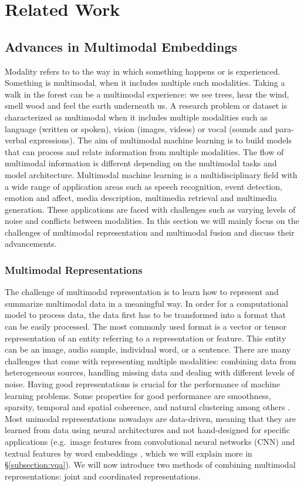 \documentclass{article}
\begin{document}
\section{Related Work}
\subsection{Advances in Multimodal Embeddings} \label{subsection:embeds}
Modality refers to to the way in which something happens or is experienced. Something is multimodal, when it includes multiple such modalities. Taking a walk in the forest can be a multimodal experience: we see trees, hear the wind, smell wood and feel the earth underneath us. A research problem or dataset is characterized as multimodal when it includes multiple modalities such as language (written or spoken), vision (images, videos) or vocal (sounds and para-verbal expressions). The aim of multimodal machine learning is to build models that can process and relate information from multiple modalities. The flow of multimodal information is different depending on the multimodal tasks and model architecture. Multimodal machine learning is a multidisciplinary field with a wide range of application areas such as speech recognition, event detection, emotion and affect, media description, multimedia retrieval and multimedia generation. These applications are faced with challenges such as varying levels of noise and conflicts between modalities. In this section we will mainly focus on the challenges of multimodal representation and multimodal fusion and discuss their advancements.

\subsubsection{Multimodal Representations}

The challenge of multimodal representation is to learn how to represent and summarize multimodal data in a meaningful way. In order for a computational model to process data, the data first has to be transformed into a format that can be easily processed. The most commonly used format is a vector or tensor representation of an entity referring to a representation or feature. This entity can be an image, audio sample, individual word, or a sentence. There are many challenges that come with representing multiple modalities: combining data from heterogeneous sources, handling missing data and dealing with different levels of noise. Having good representations is crucial for the performance of machine learning problems. Some properties for good performance are smoothness, sparsity, temporal and spatial coherence, and natural clustering among others \citep{bengio2013represent}. Most unimodal representations nowadays are data-driven, meaning that they are learned from data using neural architectures and not hand-designed for specific applications (e.g.\ image features from convolutional neural networks (CNN) \citep{krizhevsky2012imagenet} and textual features by word embeddings \citep{mikolov2013distri}, which we will explain more in \S \ref{subsection:vqa}). We will now introduce two methods of combining multimodal representations: joint and coordinated representations.
\end{document}
